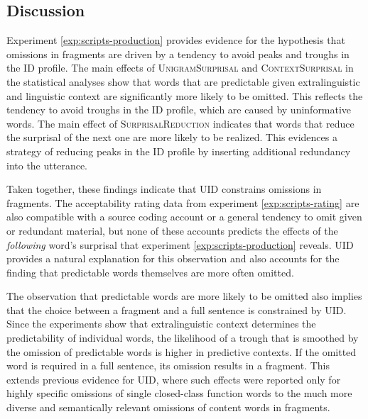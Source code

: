 \subsection{Discussion}

Experiment \ref{exp:scripts-production} provides evidence for the hypothesis that omissions in fragments are driven by a tendency to avoid peaks and troughs in the ID profile. The main effects of \textsc{UnigramSurprisal} and \textsc{ContextSurprisal} in the statistical analyses show that words that are predictable given extralinguistic and linguistic context are significantly more likely to be omitted. This reflects the tendency to avoid troughs in the ID profile, which are caused by uninformative words. The main effect of \textsc{SurprisalReduction} indicates that words that reduce the surprisal of the next one are more likely to be realized. This evidences a strategy of reducing peaks in the ID profile by inserting additional redundancy into the utterance.

Taken together, these findings indicate that UID constrains omissions in fragments. The acceptability rating data from experiment \ref{exp:scripts-rating} are also compatible with a source coding account or a general tendency to omit given or redundant material, but none of these accounts predicts the effects of the \textit{following} word's surprisal that experiment \ref{exp:scripts-production} reveals. UID provides a natural explanation for this observation and also accounts for the finding that predictable words themselves are more often omitted.

The observation that predictable words are more likely to be omitted also implies that the choice between a fragment and a full sentence is constrained by UID. Since the experiments show that extralinguistic context determines the predictability of individual words, the likelihood of a trough that is smoothed by the omission of predictable words is higher in predictive contexts. If the omitted word is required in a full sentence, its omission results in a fragment. This extends previous evidence for UID, where such effects were reported only for highly specific omissions of single closed-class function words to the much more diverse and semantically relevant omissions of content words in fragments. 

